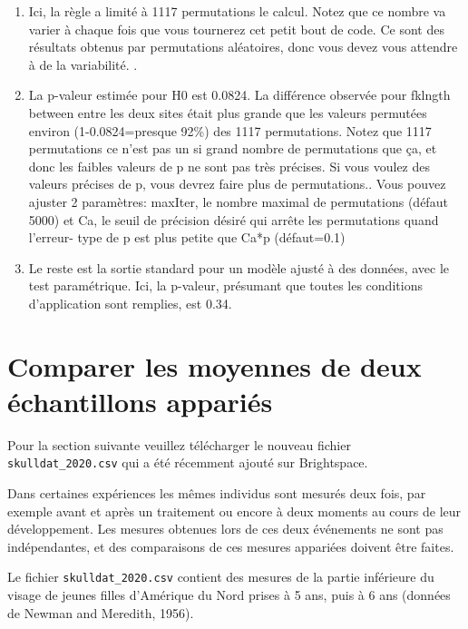 \documentclass[12pt,]{book}
\makeatletter
\providecommand{\tightlist}{%
  \setlength{\itemsep}{0pt}\setlength{\parskip}{0pt}}
\newenvironment{kframe}{%
\medskip{}
\setlength{\fboxsep}{.8em}
 \def\at@end@of@kframe{}%
 \ifinner\ifhmode%
  \def\at@end@of@kframe{\end{minipage}}%
  \begin{minipage}{\columnwidth}%
 \fi\fi%
 \def\FrameCommand##1{\hskip\@totalleftmargin \hskip-\fboxsep
 \colorbox{shadecolor}{##1}\hskip-\fboxsep
     \hskip-\linewidth \hskip-\@totalleftmargin \hskip\columnwidth}%
 \MakeFramed {\advance\hsize-\width
   \@totalleftmargin\z@ \linewidth\hsize
   \@setminipage}}%
 {\par\unskip\endMakeFramed%
 \at@end@of@kframe}
\newenvironment{rmdblock}[1]
  {
  \begin{itemize}
  \renewcommand{\labelitemi}{
    \raisebox{-.7\height}[0pt][0pt]{
      {\setkeys{Gin}{width=3em,keepaspectratio}\texttt{[image: images/\#1]}}
    }
  }
  \setlength{\fboxsep}{1em}
  \begin{kframe}
  \item
  }
  {
  \end{kframe}
  \end{itemize}
  }
\newenvironment{rmdwarning}
  {\begin{rmdblock}{warning}}
  {\end{rmdblock}}
\makeatother
\begin{document}
\begin{enumerate}
\def\labelenumi{\arabic{enumi}.}
\tightlist
\item
  Ici, la règle a limité à 1117 permutations le calcul. Notez que ce nombre va varier à chaque fois que vous tournerez cet petit bout de code. Ce sont des résultats obtenus par permutations aléatoires, donc vous devez vous attendre à de la variabilité. .
\item
  La p-valeur estimée pour H0 est 0.0824. La différence observée pour fklngth between entre les deux sites était plus grande que les valeurs permutées environ (1-0.0824=presque 92\%) des 1117 permutations. Notez que 1117 permutations ce n'est pas un si grand nombre de permutations que ça, et donc les faibles valeurs de p ne sont pas très précises. Si vous voulez des valeurs précises de p, vous devrez faire plus de permutations.. Vous pouvez ajuster 2 paramètres: maxIter, le nombre maximal de permutations (défaut 5000) et Ca, le seuil de précision désiré qui arrête les permutations quand l'erreur- type de p est plus petite que Ca*p (défaut=0.1)
\item
  Le reste est la sortie standard pour un modèle ajusté à des
  données, avec le test paramétrique. Ici, la p-valeur, présumant que toutes les conditions d'application sont remplies, est 0.34.
\end{enumerate}

\hypertarget{comparer-les-moyennes-de-deux-uxe9chantillons-appariuxe9s}{%
\section{Comparer les moyennes de deux échantillons appariés}\label{comparer-les-moyennes-de-deux-uxe9chantillons-appariuxe9s}}

\begin{rmdwarning}
Pour la section suivante veuillez télécharger le nouveau fichier \texttt{skulldat\_2020.csv} qui a été récemment ajouté sur Brightspace.
\end{rmdwarning}

Dans certaines expériences les mêmes individus sont mesurés deux fois, par exemple avant et après un traitement ou encore à deux moments au cours de leur développement. Les mesures obtenues lors de ces deux événements ne sont pas indépendantes, et des comparaisons de ces mesures appariées doivent être faites.

Le fichier \texttt{skulldat\_2020.csv} contient des mesures de la partie inférieure du visage de jeunes filles d'Amérique du Nord prises à 5 ans, puis à 6 ans (données de Newman and Meredith, 1956).
\end{document}
